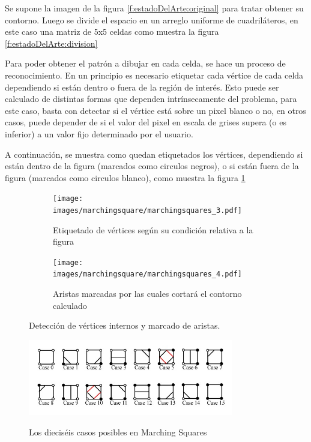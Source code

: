 Se supone la imagen de la figura \ref{f:estadoDelArte:original} para tratar obtener su contorno. Luego se divide el espacio en un arreglo uniforme de cuadriláteros, en este caso una
matriz de 5x5 celdas como muestra la figura \ref{f:estadoDelArte:division}

Para poder obtener el patrón a dibujar en cada celda, se hace un proceso de
reconocimiento. En un principio es necesario etiquetar cada vértice de cada celda dependiendo si
están dentro o fuera de la región de interés. Esto puede ser calculado de distintas formas que
dependen intrínsecamente del problema, para este caso, basta con detectar si el vértice está sobre
un pixel blanco o no, en otros casos, puede depender de si el valor del pixel en escala de
grises supera (o es inferior) a un valor fijo determinado por el usuario.

A continuación, se muestra como quedan etiquetados los vértices, dependiendo si están
dentro de la figura (marcados como circulos negros), o si están fuera de la figura (marcados como circulos blanco), como muestra la figura \ref{f:estadoDelArte:labeledobj}

\newpage
\begin{figure}[h]

	\begin{subfigure}[h]{0.46\textwidth}
		\centering
			\texttt{[image: images/marchingsquare/marchingsquares\_3.pdf]}
		\caption{Etiquetado de vértices según su condición relativa a la figura}
		\label{f:estadoDelArte:labeledobj}
	\end{subfigure}
	\quad
	\begin{subfigure}[h]{0.46\textwidth}
		\centering
			\texttt{[image: images/marchingsquare/marchingsquares\_4.pdf]}
		\caption{Aristas marcadas por las cuales cortará el contorno calculado}
		\label{f:estadoDelArte:purpledobj}
	\end{subfigure}

	\caption{Detección de vértices internos y marcado de aristas.}

\end{figure}

\begin{figure}[h]
\centering
	\fbox
	{
		\includegraphics[width=0.8\textwidth]{images/marchingsquare/cases.jpg}
	}
\caption{Los dieciséis casos posibles en Marching Squares}
\label{f:estadoDelArte:cases}
\end{figure}

